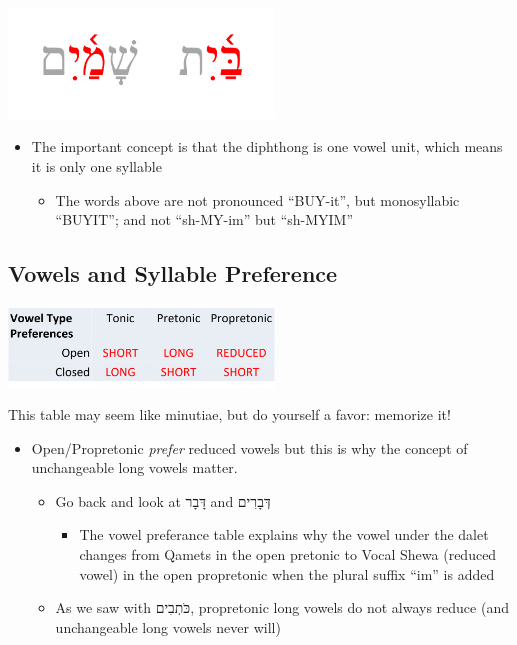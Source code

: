 \documentclass[
]{turabian-researchpaper}
\providecommand{\tightlist}{%
  \setlength{\itemsep}{0pt}\setlength{\parskip}{0pt}}
\begin{document}
\begin{center}\includegraphics[width=200pt]{images/03.diphthong} \end{center}

\begin{itemize}
\tightlist
\item
  The important concept is that the diphthong is one vowel unit, which means it is only one syllable

  \begin{itemize}
  \tightlist
  \item
    The words above are not pronounced ``BUY-it'', but monosyllabic ``BUYIT''; and not ``sh-MY-im'' but ``sh-MYIM''
  \end{itemize}
\end{itemize}

\hypertarget{three_6}{%
\subsection{Vowels and Syllable Preference}\label{three_6}}

\begin{center}\includegraphics[width=200pt]{images/03.vowelpreferencetable} \end{center}

This table may seem like minutiae, but do yourself a favor: memorize it!

\begin{itemize}
\tightlist
\item
  Open/Propretonic \emph{prefer} reduced vowels but this is why the concept of unchangeable long vowels matter.

  \begin{itemize}
  \tightlist
  \item
    Go back and look at דָּבָר and דְּבָרִים

    \begin{itemize}
    \tightlist
    \item
      The vowel preferance table explains why the vowel under the dalet changes from Qamets in the open pretonic to Vocal Shewa (reduced vowel) in the open propretonic when the plural suffix ``im'' is added
    \end{itemize}
  \item
    As we saw with כֹּתְבִים, propretonic long vowels do not always reduce (and unchangeable long vowels never will)
  \end{itemize}
\end{itemize}
\end{document}
